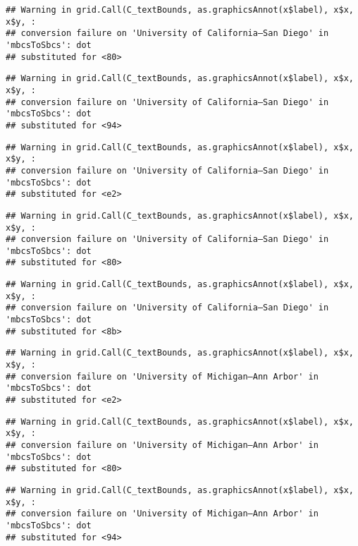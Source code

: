 \documentclass[]{article}
\begin{document}
\begin{verbatim}
## Warning in grid.Call(C_textBounds, as.graphicsAnnot(x$label), x$x, x$y, :
## conversion failure on 'University of California—​San Diego' in 'mbcsToSbcs': dot
## substituted for <80>
\end{verbatim}

\begin{verbatim}
## Warning in grid.Call(C_textBounds, as.graphicsAnnot(x$label), x$x, x$y, :
## conversion failure on 'University of California—​San Diego' in 'mbcsToSbcs': dot
## substituted for <94>
\end{verbatim}

\begin{verbatim}
## Warning in grid.Call(C_textBounds, as.graphicsAnnot(x$label), x$x, x$y, :
## conversion failure on 'University of California—​San Diego' in 'mbcsToSbcs': dot
## substituted for <e2>
\end{verbatim}

\begin{verbatim}
## Warning in grid.Call(C_textBounds, as.graphicsAnnot(x$label), x$x, x$y, :
## conversion failure on 'University of California—​San Diego' in 'mbcsToSbcs': dot
## substituted for <80>
\end{verbatim}

\begin{verbatim}
## Warning in grid.Call(C_textBounds, as.graphicsAnnot(x$label), x$x, x$y, :
## conversion failure on 'University of California—​San Diego' in 'mbcsToSbcs': dot
## substituted for <8b>
\end{verbatim}

\begin{verbatim}
## Warning in grid.Call(C_textBounds, as.graphicsAnnot(x$label), x$x, x$y, :
## conversion failure on 'University of Michigan—​Ann Arbor' in 'mbcsToSbcs': dot
## substituted for <e2>
\end{verbatim}

\begin{verbatim}
## Warning in grid.Call(C_textBounds, as.graphicsAnnot(x$label), x$x, x$y, :
## conversion failure on 'University of Michigan—​Ann Arbor' in 'mbcsToSbcs': dot
## substituted for <80>
\end{verbatim}

\begin{verbatim}
## Warning in grid.Call(C_textBounds, as.graphicsAnnot(x$label), x$x, x$y, :
## conversion failure on 'University of Michigan—​Ann Arbor' in 'mbcsToSbcs': dot
## substituted for <94>
\end{verbatim}
\end{document}
